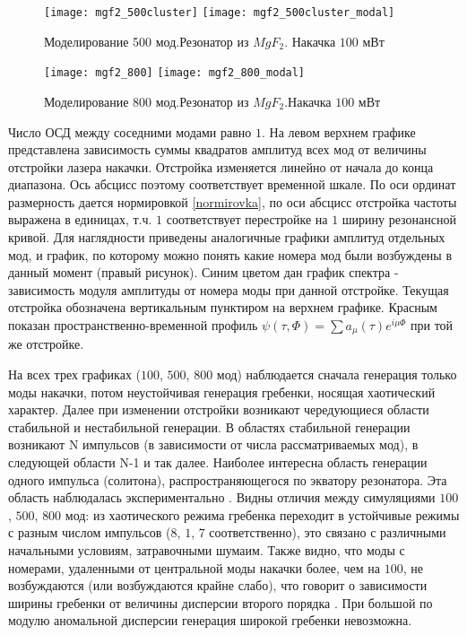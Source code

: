\begin{figure}
  \texttt{[image: mgf2\_500cluster]}
  \texttt{[image: mgf2\_500cluster\_modal]}
  \caption{Моделирование 500 мод.Резонатор из $MgF_2$. Накачка $100$ мВт} \label{500modes}
\end{figure}

\begin{figure}
  \texttt{[image: mgf2\_800]}
  \texttt{[image: mgf2\_800\_modal]}
  \caption{Моделирование 800 мод.Резонатор из $MgF_2$.Накачка $100$ мВт} \label{800modes}
\end{figure}

Число ОСД между соседними модами равно $1$. На левом верхнем графике представлена зависимость суммы квадратов амплитуд всех мод от величины отстройки лазера накачки. Отстройка изменяется линейно от начала до конца диапазона. Ось абсцисс поэтому соответствует временной шкале.  По оси ординат размерность дается нормировкой \eqref{normirovka}, по оси абсцисс отстройка частоты выражена в единицах, т.ч. $1$ соответствует перестройке на $1$ ширину резонансной кривой. Для наглядности приведены аналогичные графики амплитуд отдельных мод, и график, по которому можно понять какие номера мод были возбуждены в данный момент (правый рисунок). Синим цветом дан график спектра - зависимость модуля амплитуды от номера моды при данной отстройке. Текущая отстройка обозначена вертикальным пунктиром на верхнем графике. Красным показан пространственно-временной профиль $\psi(\tau,\Phi)=\sum a_\mu(\tau)e^{i\mu\Phi}$ при той же отстройке.

На всех трех графиках ($100$, $500$, $800$ мод) наблюдается сначала генерация только моды накачки, потом неустойчивая генерация гребенки, носящая хаотический характер. Далее при изменении отстройки возникают чередующиеся области стабильной и нестабильной генерации. В областях стабильной генерации возникают N импульсов (в зависимости от числа рассматриваемых мод), в следующей области N-1 и так далее. Наиболее интересна область генерации одного импульса (солитона), распространяющегося по экватору резонатора. Эта область наблюдалась экспериментально \cite{Herr2014}. Видны отличия между симуляциями $100$, $500$, $800$ мод: из хаотического режима гребенка переходит в устойчивые режимы с разным числом импульсов ($8$, $1$, $7$ соответственно), это связано с различными начальными условиям, затравочными шумаим. Также видно, что моды с номерами, удаленными от центральной моды накачки более, чем на $100$, не возбуждаются (или возбуждаются крайне слабо), что говорит о зависимости ширины гребенки от величины дисперсии второго порядка \cite{Brasch2016}. При большой по модулю аномальной дисперсии генерация широкой гребенки невозможна.


